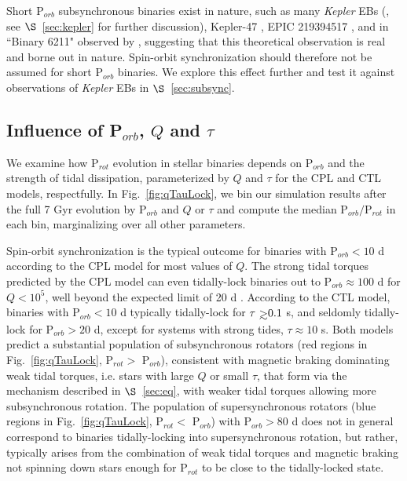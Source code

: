 \documentclass[twocolumn]{aastex61}
\def\gsim{~\rlap{$>$}{\lower 1.0ex\hbox{$\sim$}}}
\newcommand{\kepler}[0]{\textit{Kepler}\xspace}
\begin{document}
Short P$_{orb}$ subsynchronous binaries exist in nature, such as many \kepler EBs (\citet{Lurie2017}, see $\S$~\ref{sec:kepler} for further discussion), Kepler-47 \citep{Orosz2012}, EPIC 219394517 \citep{Torres2018}, and in ``Binary 6211" observed by \citet{Meibom2006}, suggesting that this theoretical observation is real and borne out in nature. Spin-orbit synchronization should therefore not be assumed for short P$_{orb}$ binaries.  We explore this effect further and test it against observations of \kepler EBs in $\S$~\ref{sec:subsync}.

\subsection{Influence of P$_{orb}$, $Q$ and $\tau$} \label{sec:qTauMaps}

We examine how P$_{rot}$ evolution in stellar binaries depends on P$_{orb}$ and the strength of tidal dissipation, parameterized by $Q$ and $\tau$ for the CPL and CTL models, respectfully. In Fig.~\ref{fig:qTauLock}, we bin our simulation results after the full 7 Gyr evolution by P$_{orb}$ and $Q$ or $\tau$ and compute the median P$_{orb}/$P$_{rot}$ in each bin, marginalizing over all other parameters.

Spin-orbit synchronization is the typical outcome for binaries with P$_{orb} < 10$ d according to the CPL model for most values of $Q$. The strong tidal torques predicted by the CPL model can even tidally-lock binaries out to P$_{orb} \approx 100 $ d for $Q < 10^5$, well beyond the expected limit of 20 d \citep{Meibom2006}.  According to the CTL model, binaries with P$_{orb} < 10$ d typically tidally-lock for $\tau \gsim 0.1$ s, and seldomly tidally-lock for P$_{orb} > 20$ d, except for systems with strong tides, $\tau \approx 10$ s.  Both models predict a substantial population of subsynchronous rotators (red regions in Fig.~\ref{fig:qTauLock}, P$_{rot} >$ P$_{orb}$), consistent with magnetic braking dominating weak tidal torques, i.e. stars with large $Q$ or small $\tau$, that form via the mechanism described in $\S$~\ref{sec:eq}, with weaker tidal torques allowing more subsynchronous rotation.  The population of supersynchronous rotators (blue regions in Fig.~\ref{fig:qTauLock}, P$_{rot} <$ P$_{orb}$) with P$_{orb} > 80$ d does not in general correspond to binaries tidally-locking into supersynchronous rotation, but rather, typically arises from the combination of weak tidal torques and magnetic braking not spinning down stars enough for P$_{rot}$ to be close to the tidally-locked state.  
\end{document}
